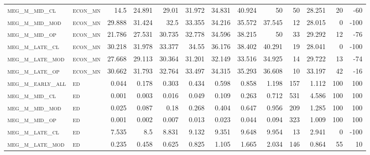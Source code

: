 \begin{landscape}
\begin{center}
\begin{footnotesize}
\begin{longtable}{llrrrrrrrr|rrr}
\textsc{meg\_m\_mid\_cl   } & \textsc{econ\_mn  }   & 14.5     & 24.891   & 29.01    & 31.972   & 34.831   & 40.924   & 50        & 50     & 28.251        & 20            & -60             \\
\textsc{meg\_m\_mid\_mod  } & \textsc{econ\_mn  }   & 29.888   & 31.424   & 32.5     & 33.355   & 34.216   & 35.572   & 37.545    & 12     & 28.015        & 0             & -100            \\
\textsc{meg\_m\_mid\_op   } & \textsc{econ\_mn  }   & 21.786   & 27.531   & 30.735   & 32.778   & 34.596   & 38.215   & 50        & 33     & 29.292        & 12            & -76             \\
\textsc{meg\_m\_late\_cl  } & \textsc{econ\_mn  }   & 30.218   & 31.978   & 33.377   & 34.55    & 36.176   & 38.402   & 40.291    & 19     & 28.041        & 0             & -100            \\
\textsc{meg\_m\_late\_mod } & \textsc{econ\_mn  }   & 27.668   & 29.113   & 30.364   & 31.201   & 32.149   & 33.516   & 34.925    & 14     & 29.722        & 13            & -74             \\
\textsc{meg\_m\_late\_op  } & \textsc{econ\_mn  }   & 30.662   & 31.793   & 32.764   & 33.497   & 34.315   & 35.293   & 36.608    & 10     & 33.197        & 42            & -16             \\
\textsc{meg\_m\_early\_all} & \textsc{ed        }   & 0.044    & 0.178    & 0.303    & 0.434    & 0.598    & 0.858    & 1.198     & 157    & 1.112         & 100           & 100             \\
\textsc{meg\_m\_mid\_cl   } & \textsc{ed        }   & 0.001    & 0.003    & 0.016    & 0.049    & 0.109    & 0.263    & 0.712     & 531    & 4.586         & 100           & 100             \\
\textsc{meg\_m\_mid\_mod  } & \textsc{ed        }   & 0.025    & 0.087    & 0.18     & 0.268    & 0.404    & 0.647    & 0.956     & 209    & 1.285         & 100           & 100             \\
\textsc{meg\_m\_mid\_op   } & \textsc{ed        }   & 0.001    & 0.002    & 0.007    & 0.013    & 0.023    & 0.044    & 0.094     & 323    & 1.009         & 100           & 100             \\
\textsc{meg\_m\_late\_cl  } & \textsc{ed        }   & 7.535    & 8.5      & 8.831    & 9.132    & 9.351    & 9.648    & 9.954     & 13     & 2.941         & 0             & -100            \\
\textsc{meg\_m\_late\_mod } & \textsc{ed        }   & 0.235    & 0.458    & 0.625    & 0.825    & 1.105    & 1.665    & 2.034     & 146    & 0.864         & 55            & 10              \\

\end{longtable}
\end{footnotesize}
\end{center}
\end{landscape}
